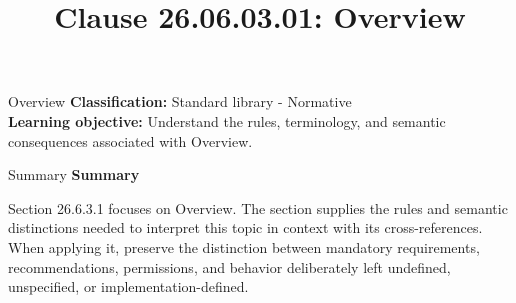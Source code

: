 \documentclass[10pt,letterpaper]{article}
\title{Clause 26.06.03.01: Overview}
\author{}
\date{}
\begin{document}
\maketitle
\begin{CornellOverviewBox}{Overview}
\textbf{Classification:} Standard library - Normative\\[2pt]
\textbf{Learning objective:} Understand the rules, terminology, and semantic consequences associated with Overview.
\end{CornellOverviewBox}\begin{CornellSummaryBox}{Summary}
{\sffamily\bfseries\color{Accent} Summary}\par\vspace{3pt}Section 26.6.3.1 focuses on Overview. The section supplies the rules and semantic distinctions needed to interpret this topic in context with its cross-references. When applying it, preserve the distinction between mandatory requirements, recommendations, permissions, and behavior deliberately left undefined, unspecified, or implementation-defined.
\end{CornellSummaryBox}
\end{document}
